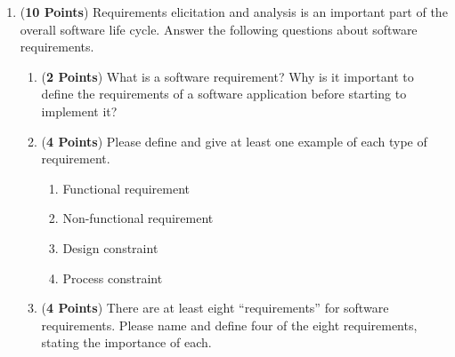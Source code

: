 \documentclass[12pt,epsf,psfig,graphicx]{article}
\begin{document}
% 
\begin{enumerate}

\item ({\bf 10 Points}) Requirements elicitation and analysis is an important part of the overall software life cycle.
	Answer the following questions about software requirements.

\begin{enumerate}

	\item ({\bf 2 Points}) What is a software requirement? Why is it important to define the requirements of a software
		application before starting to implement it?

	\item ({\bf 4 Points}) Please define and give at least one example of each type of requirement.

		\begin{enumerate}
			\item Functional requirement
			\item Non-functional requirement
			\item Design constraint
			\item Process constraint
		\end{enumerate}

	\item ({\bf 4 Points}) There are at least eight ``requirements'' for software requirements.  Please name and define
		four of the eight requirements, stating the importance of each.



% 

% 
\end{enumerate}


\end{enumerate}
\end{document}
